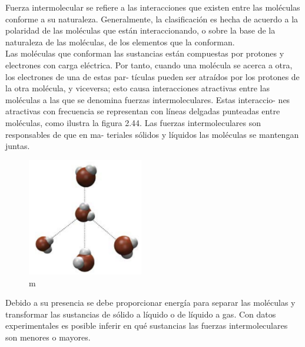\documentclass[12pt,addpoints,answers]{guia}
\begin{document}
\begin{tcolorbox}[enhanced,attach boxed title to top center={yshift=-3mm,yshifttext=-1mm},
        colback=blue!5!white,colframe=blue!75!black,colbacktitle=red!80!black,
        title=Fuerzas intermoleculares,fonttitle=\bfseries,
        boxed title style={size=small,colframe=red!50!black} ]
    Fuerza intermolecular se refiere a las interacciones que existen entre las moléculas conforme a su naturaleza. Generalmente, la clasificación es hecha de acuerdo a la polaridad de las moléculas que están interaccionando, o sobre la base de la naturaleza de las moléculas, de los elementos que la conforman.\\
    Las moléculas que conforman las sustancias están compuestas
    por protones y electrones con carga eléctrica. Por tanto, cuando
    una molécula se acerca a otra, los electrones de una de estas par-
    tículas pueden ser atraídos por los protones de la otra molécula,
    y viceversa; esto causa interacciones atractivas entre las moléculas
    a las que se denomina fuerzas intermoleculares. Estas interaccio-
    nes atractivas con frecuencia se representan con líneas delgadas
    punteadas entre moléculas, como ilustra la figura 2.44.
    Las fuerzas intermoleculares son responsables de que en ma-
    teriales sólidos y líquidos las moléculas se mantengan juntas.
    \begin{figure}[H]
        \includegraphics[width=0.45\textwidth]{../images/20230321054752.png}
        \caption{m}
        \label{fig:20230321054752}
    \end{figure}
    Debido a su presencia se debe proporcionar energía para separar
    las moléculas y transformar las sustancias de sólido a líquido o de
    líquido a gas. Con datos experimentales es posible inferir en qué
    sustancias las fuerzas intermoleculares son menores o mayores.
\end{tcolorbox}
\end{document}
